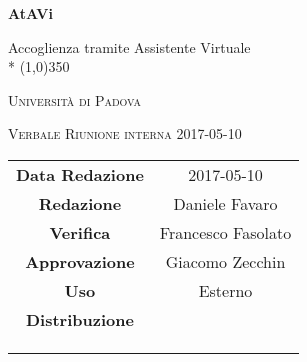 \documentclass[a4paper,12pt]{article}
\author{Daniele Favaro}
\date{10/05/2017}
\begin{document}
\begin{titlepage}
	\centering
	{\huge\bfseries AtAVi\par}
	Accoglienza tramite Assistente Virtuale \\*
	\line(1,0){350} \\
	{\scshape\LARGE Università di Padova \par}
	\vspace{1cm}
	{\scshape\Large Verbale Riunione interna 2017-05-10\par}
	\vspace{1.5cm}
	\logo
	\vspace{2cm}	
	\vfill \vfill
	\begin{tabular}{c|c}
		{\hfill\textbf{Data Redazione}} 		& 2017-05-10	\\
		{\hfill\textbf{Redazione}} 				& Daniele Favaro		\\
		{\hfill\textbf{Verifica}} 				& Francesco Fasolato \\
		{\hfill\textbf{Approvazione}} 			& Giacomo Zecchin  \\
		{\hfill\textbf{Uso}} 					& Esterno		\\
		{\hfill\textbf{Distribuzione}} 			& \kpanic \\ & \vardanega \\ & \cardin \\ & \prop \\
	\end{tabular}
\end{titlepage}

	\pagestyle{myfront}
	\newpage
	\tableofcontents
	
	\label{LastFrontPage}
	
	\newpage
	\pagestyle{mymain}
		
		
		
		
		
			
	\label{LastPage}
\end{document}
